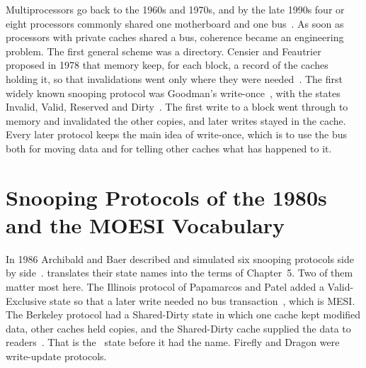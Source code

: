 Multiprocessors go back to the 1960s and 1970s, and by the late 1990s four or
eight processors commonly shared one motherboard and one
bus~\cite[\S12.1]{sarangi2025basic}. As soon as processors with private caches
shared a bus, coherence became an engineering problem. The first general scheme
was a directory. Censier and Feautrier proposed in 1978 that memory keep, for each
block, a record of the caches holding it, so that invalidations went only where
they were needed~\cite{censier1978directory}. The first widely known snooping
protocol was Goodman's write-once~\cite{goodman1983writeonce}, with the states
Invalid, Valid, Reserved and Dirty~\cite{archibald1986evaluation}. The first write
to a block went through to memory and invalidated the other copies, and later
writes stayed in the cache. Every later protocol keeps the main idea of
write-once, which is to use the bus both for moving data and for telling other
caches what has happened to it.

\section{Snooping Protocols of the 1980s and the MOESI Vocabulary}
\label{sec:hist-1980s}
\label{sec:hist-moesi}
%

In 1986 Archibald and Baer described and simulated six snooping protocols side by
side~\cite{archibald1986evaluation}.  translates their
state names into the terms of Chapter~5. Two of them matter most here. The
Illinois protocol of Papamarcos and Patel added a Valid-Exclusive state so that a
later write needed no bus transaction~\cite{papamarcos1984illinois}, which is
MESI. The Berkeley protocol had a Shared-Dirty state in which one cache kept
modified data, other caches held copies, and the Shared-Dirty cache supplied the
data to readers~\cite{archibald1986evaluation}. That is the \stO\ state before it
had the name. Firefly and Dragon were write-update protocols.


